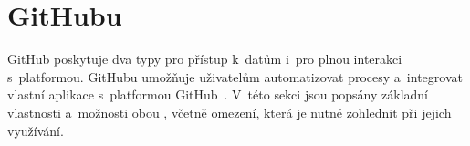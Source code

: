 
\section{\API GitHubu}
\label{sec:github_api}

GitHub poskytuje dva typy \API pro přístup k~datům i~pro plnou interakci s~platformou. \API GitHubu umožňuje uživatelům automatizovat procesy a~integrovat vlastní aplikace s~platformou GitHub~\cite{github_rest_api}.
V~této sekci jsou popsány základní vlastnosti a~možnosti obou \API, včetně omezení, která je nutné zohlednit při jejich využívání.






\endinput